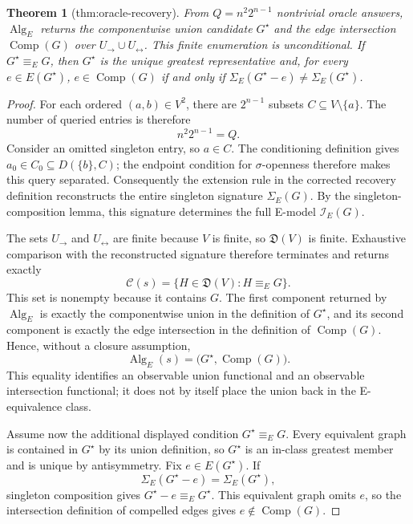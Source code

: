 \documentclass{article}
\newtheorem{theorem}{Theorem}
\begin{document}
\begin{theorem}[thm:oracle-recovery]\label{thm:oracle-recovery}
From \(Q=n^2 2^{n-1}\) nontrivial oracle answers, \(\operatorname{Alg}_E\) returns the componentwise union candidate \(G^\star\) and the edge intersection \(\operatorname{Comp}(G)\) over \(U_{\to}\cup U_{\leftrightarrow}\). This finite enumeration is unconditional. If \(G^\star\equiv_EG\), then \(G^\star\) is the unique greatest representative and, for every \(e\in E(G^\star)\), \(e\in\operatorname{Comp}(G)\) if and only if \(\Sigma_E(G^\star-e)\ne\Sigma_E(G^\star)\).
\end{theorem}
\begin{proof}
For each ordered \((a,b)\in V^2\), there are \(2^{n-1}\) subsets \(C\subseteq V\setminus\{a\}\).  The number of queried entries is therefore
\[
 n^2 2^{n-1}=Q.
\]
Consider an omitted singleton entry, so \(a\in C\).  The conditioning definition gives \(a_0\in C_0\subseteq D(\{b\},C)\); the endpoint condition for \(\sigma\)-openness therefore makes this query separated.  Consequently the extension rule in the corrected recovery definition reconstructs the entire singleton signature \(\Sigma_E(G)\).  By the singleton-composition lemma, this signature determines the full E-model \(\mathcal I_E(G)\).

The sets \(U_{\to}\) and \(U_{\leftrightarrow}\) are finite because \(V\) is finite, so \(\mathfrak D(V)\) is finite.  Exhaustive comparison with the reconstructed signature therefore terminates and returns exactly
\[
 \mathcal C(s)=\{H\in\mathfrak D(V):H\equiv_EG\}.
\]
This set is nonempty because it contains \(G\).  The first component returned by \(\operatorname{Alg}_E\) is exactly the componentwise union in the definition of \(G^\star\), and its second component is exactly the edge intersection in the definition of \(\operatorname{Comp}(G)\).  Hence, without a closure assumption,
\[
 \operatorname{Alg}_E(s)=\bigl(G^\star,\operatorname{Comp}(G)\bigr).
\]
This equality identifies an observable union functional and an observable intersection functional; it does not by itself place the union back in the E-equivalence class.

Assume now the additional displayed condition \(G^\star\equiv_EG\).  Every equivalent graph is contained in \(G^\star\) by its union definition, so \(G^\star\) is an in-class greatest member and is unique by antisymmetry.  Fix \(e\in E(G^\star)\).  If
\[
 \Sigma_E(G^\star-e)=\Sigma_E(G^\star),
\]
singleton composition gives \(G^\star-e\equiv_EG^\star\).  This equivalent graph omits \(e\), so the intersection definition of compelled edges gives \(e\notin\operatorname{Comp}(G)\).


\end{proof}
\end{document}
